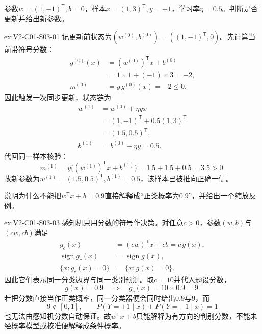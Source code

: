 \begin{SLChapterExercisePairSection}
\begin{exercise}\label{ex:V2-C01-S03-01}
参数$w=(1,-1)^{\mathsf T},b=0$，样本$x=(1,3)^{\mathsf T},y=+1$，学习率$\eta=0.5$。判断是否更新并给出新参数。
\end{exercise}
\ifSLFullEdition
{}\label{sol:V2-C01-S03-01}
\begin{chapterexercisesolution}{ex:V2-C01-S03-01}
记更新前状态为$(w^{(0)},b^{(0)})=((1,-1)^{\mathsf T},0)$。先计算当前带符号分数：
\[
\begin{aligned}
g^{(0)}(x)
&=(w^{(0)})^{\mathsf T}x+b^{(0)}\\
&=1\times1+(-1)\times3=-2,\\
m^{(0)}&=y\,g^{(0)}(x)=-2\leq0.
\end{aligned}
\]
因此触发一次同步更新，状态链为
\[
\begin{aligned}
w^{(1)}
&=w^{(0)}+\eta yx\\
&=(1,-1)^{\mathsf T}+0.5(1,3)^{\mathsf T}\\
&=(1.5,0.5)^{\mathsf T},\\
b^{(1)}&=b^{(0)}+\eta y=0.5.
\end{aligned}
\]
代回同一样本核验：
\[
m^{(1)}
=y\bigl((w^{(1)})^{\mathsf T}x+b^{(1)}\bigr)
=1.5+1.5+0.5
=3.5>0.
\]
故新参数为$w^{(1)}=(1.5,0.5)^{\mathsf T},b^{(1)}=0.5$，该样本已被推向正确一侧。
\end{chapterexercisesolution}
\fi

\begin{exercise}\label{ex:V2-C01-S03-03}
说明为什么不能把$w^{\mathsf T}x+b=0.9$直接解释成“正类概率为$0.9$”，并给出一个缩放反例。
\end{exercise}
\ifSLFullEdition
{}\label{sol:V2-C01-S03-03}
\begin{chapterexercisesolution}{ex:V2-C01-S03-03}
感知机只用分数的符号作决策。对任意$c>0$，参数$(w,b)$与$(cw,cb)$满足
\[
\begin{aligned}
g_c(x)&=(cw)^{\mathsf T}x+cb=c\,g(x),\\
\operatorname{sign}g_c(x)&=\operatorname{sign}g(x),\\
\{x:g_c(x)=0\}&=\{x:g(x)=0\}.
\end{aligned}
\]
因此它们表示同一分类边界与同一类别预测。取$c=10$并代入题设分数，
\[
g(x)=0.9
\quad\Longrightarrow\quad
g_c(x)=10\times0.9=9.
\]
若把分数直接当作正类概率，同一分类器便会同时给出$0.9$与$9$，而
\[
9\notin[0,1],
\qquad
P(Y=+1\mid x)+P(Y=-1\mid x)=1
\]
也无法由感知机分数自动保证。故$w^{\mathsf T}x+b$只能解释为有方向的判别分数，不能未经概率模型或校准便解释成条件概率。
\end{chapterexercisesolution}
\fi


\end{SLChapterExercisePairSection}
